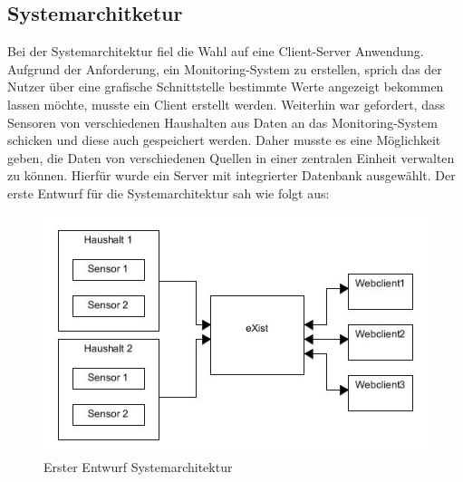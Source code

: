 \subsection{Systemarchitketur}
Bei der Systemarchitektur fiel die Wahl auf eine Client-Server Anwendung. Aufgrund der Anforderung, ein Monitoring-System zu erstellen, sprich das der Nutzer über eine grafische Schnittstelle bestimmte Werte angezeigt bekommen lassen möchte, musste ein Client erstellt werden. Weiterhin war gefordert, dass Sensoren von verschiedenen Haushalten aus Daten an das Monitoring-System schicken und diese auch gespeichert werden. Daher musste es eine Möglichkeit geben, die Daten von verschiedenen Quellen in einer zentralen Einheit verwalten zu können. Hierfür wurde ein Server mit integrierter Datenbank ausgewählt. Der erste Entwurf für die Systemarchitektur sah wie folgt aus:

\begin{figure}[h]
\begin{center}
\includegraphics[scale=0.7]{images/sa1.jpg} 
\caption{Erster Entwurf Systemarchitektur}
\end{center}
\end{figure}

